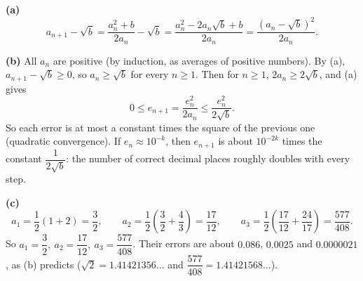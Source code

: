 \textbf{(a)}
\[
a_{n+1}-\sqrt b=\dfrac{a_n^2+b}{2a_n}-\sqrt b=\dfrac{a_n^2-2a_n\sqrt b+b}{2a_n}=\dfrac{\left(a_n-\sqrt b\right)^2}{2a_n}.
\]

\textbf{(b)} All $a_n$ are positive (by induction, as averages of positive numbers). By (a), $a_{n+1}-\sqrt b\ge0$, so $a_n\ge\sqrt b$ for every $n\ge1$. Then for $n\ge1$, $2a_n\ge2\sqrt b$, and (a) gives
\[
0\le e_{n+1}=\dfrac{e_n^2}{2a_n}\le\dfrac{e_n^2}{2\sqrt b}.
\]
So each error is at most a constant times the square of the previous one (quadratic convergence). If $e_n\approx10^{-k}$, then $e_{n+1}$ is about $10^{-2k}$ times the constant $\dfrac{1}{2\sqrt b}$: the number of correct decimal places roughly doubles with every step.

\textbf{(c)}
\[
a_1=\dfrac{1}{2}\left(1+2\right)=\dfrac{3}{2},\qquad a_2=\dfrac{1}{2}\left(\dfrac{3}{2}+\dfrac{4}{3}\right)=\dfrac{17}{12},\qquad a_3=\dfrac{1}{2}\left(\dfrac{17}{12}+\dfrac{24}{17}\right)=\dfrac{577}{408}.
\]
So $\boxed{a_1=\dfrac{3}{2},\ a_2=\dfrac{17}{12},\ a_3=\dfrac{577}{408}}$. Their errors are about $0.086$, $0.0025$ and $0.0000021$, as (b) predicts ($\sqrt2=1.41421356\ldots$ and $\dfrac{577}{408}=1.41421568\ldots$).
